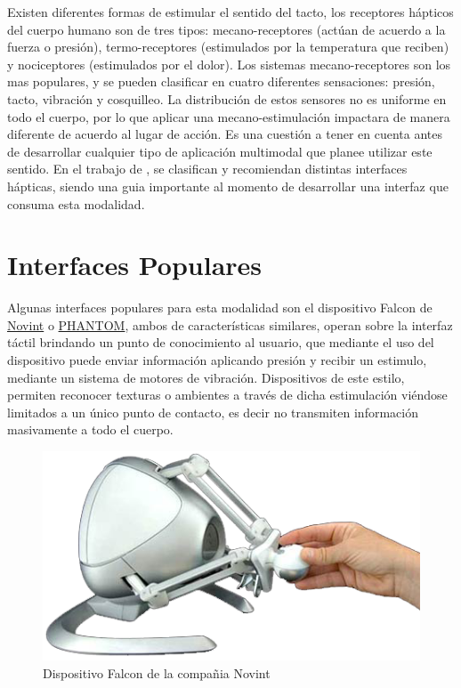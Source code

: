 Existen diferentes formas de estimular el sentido del tacto, los receptores hápticos del cuerpo humano son de tres tipos: mecano-receptores (actúan de acuerdo a la fuerza o presión), termo-receptores (estimulados por la temperatura que reciben) y nociceptores (estimulados por el dolor).
Los sistemas mecano-receptores son los mas populares, y se pueden clasificar en cuatro diferentes sensaciones: presión, tacto, vibración y cosquilleo. La distribución de estos sensores no es uniforme en todo el cuerpo, por lo que aplicar una mecano-estimulación impactara de manera diferente de acuerdo al lugar de acción. Es una cuestión a tener en cuenta antes de desarrollar cualquier tipo de aplicación multimodal que planee utilizar este sentido. En el trabajo de \citet{hale2004deriving}, se clasifican y recomiendan distintas interfaces hápticas, siendo una guia importante al momento de desarrollar una interfaz que consuma esta modalidad.

\section{Interfaces Populares}
Algunas interfaces populares para esta modalidad son el dispositivo Falcon de \href{http://www.novint.com/index.php/novintfalcon}{Novint} o \href{http://www.dentsable.com/haptic-phantom-desktop.htm}{PHANTOM}, ambos de características similares, operan sobre la interfaz táctil brindando un punto de conocimiento al usuario, que mediante el uso del dispositivo puede enviar información aplicando presión y recibir un estimulo, mediante un sistema de motores de vibración. Dispositivos de este estilo, permiten reconocer texturas o ambientes a través de dicha estimulación viéndose limitados a un único punto de contacto, es decir no transmiten información masivamente a todo el cuerpo.

\begin{center}
  \begin{figure}[h]
    \includegraphics[scale=1,width=\textwidth]{gfx/novint1xe6}
    \caption{Dispositivo Falcon de la compañia Novint}
    \label{fig:apx_novint}
  \end{figure}
\end{center}


